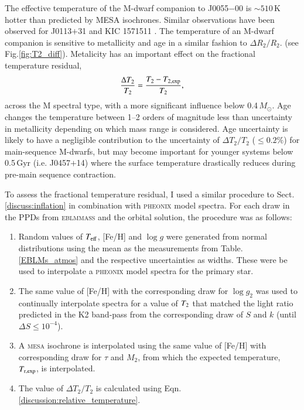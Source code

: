 The effective temperature of the M-dwarf companion to J0055$-$00 is $\sim 510$\,K hotter than predicted by MESA isochrones. Similar observations have been observed for J0113$+$31 \citep{2014A&A...572A..50G} and KIC 1571511 \citep{2012MNRAS.423L...1O}. The temperature of an M-dwarf companion is sensitive to metallicity and age in a similar fashion to $\Delta R_2 / R_2$. (see Fig.\ref{fig:T2_diff}). Metalicity has an important effect on the fractional temperature residual,
%
\begin{equation}\label{discussion:relative_temperature}
    \frac{\Delta T_2}{T_2} = \frac{T_2 - T_{\rm 2,exp}}{T_2},
\end{equation}
%
across the M spectral type, with a more significant influence below 0.4\,$M_\odot$. Age changes the temperature between 1--2 orders of magnitude less than uncertainty in metallicity depending on which mass range is considered. Age uncertainty is likely to have a negligible contribution to the uncertainty of $\Delta T_2 / T_2$ ($\leq 0.2\%$) for main-sequence M-dwarfs, but may become important for younger systems below 0.5\,Gyr (i.e. J0457$+$14) where the surface temperature drastically reduces during pre-main sequence contraction. 

To assess the fractional temperature residual, I used a similar procedure to Sect. \ref{discuss:inflation} in combination with \textsc{pheonix} model spectra. For each draw in the PPDs from \textsc{eblmmass} and the orbital solution, the procedure was as follows:

\begin{enumerate}
    \item Random values of $T_{\rm eff}$, [Fe/H] and $\log g$ were generated from normal distributions using the mean as the measurements from Table.\ref{EBLMs_atmos} and the respective uncertainties as widths. These were be used to interpolate a \textsc{pheonix} model spectra for the primary star. 
    
    \item The same value of [Fe/H] with the corresponding draw for $\log g_2$ was used to continually interpolate spectra for a value of $T_{\rm 2}$ that matched the light ratio predicted in the K2 band-pass from the corresponding draw of $S$ and $k$ (until $\Delta S \leq 10^{-4}$).
    
    \item A \textsc{mesa} isochrone is interpolated using the same value of [Fe/H] with corresponding draw for $\tau$ and $M_2$, from which the expected temperature, $T_{\rm r,exp}$, is interpolated. 
    
    \item The value of $\Delta T_2 / T_2$ is calculated using Eqn. \ref{discussion:relative_temperature}.
\end{enumerate}

